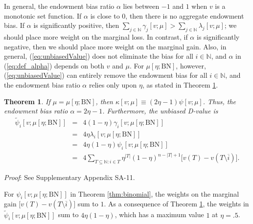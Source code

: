 \documentclass[a4paper,12pt]{article}
\newtheorem{theorem}{Theorem}
\begin{document}
In general, the endowment bias ratio $\alpha$ lies between $-1$ and $1$ when $v$ is a monotonic set function. 
If $\alpha$ is close to $0$, then there is no aggregate endowment bias. If $\alpha$ is significantly positive, 
then $\sum\limits_{j\in \mathbb{N}} \gamma_j [v;\mu] > \sum\limits_{j\in \mathbb{N}} \lambda_j [v;\mu]$; we should place more weight on the marginal loss. 
In contrast, if $\alpha$ is significantly negative, then we should place more weight on the marginal gain.
Also, in general, (\ref{eq:unbiasedValue}) does not eliminate the bias for all $i\in \mathbb{N}$, and $\alpha$ in (\ref{eq:def_alpha}) depends on both $v$ and $\mu$. 
For $\mu[\eta; \mathrm{BN}]$, however, (\ref{eq:unbiasedValue}) can entirely remove the endowment bias 
for all $i\in \mathbb{N}$, and the endowment bias ratio $\alpha$ relies only upon $\eta$, as stated in Theorem \ref{thm:binomialbias}.

\begin{theorem}\label{thm:binomialbias}
If $\mu = \mu[\eta; \mathrm{BN}]$, then $\kappa[v;\mu] \equiv (2\eta-1) \psi[v; \mu]$. 
Thus, the endowment bias ratio $\alpha = 2\eta-1$. 
Furthermore, the unbiased D-value is
$$
\begin{array}{rcl}
\tilde \psi_i[v; \mu[\eta; \mathrm{BN}]] 
&=& 4(1-\eta)\gamma_i[v; \mu[\eta; \mathrm{BN}] ] \\
&=& 4\eta\lambda_i[v; \mu[\eta; \mathrm{BN}] ]  \\
&=& 4\eta (1-\eta)\psi_i[v; \mu[\eta; \mathrm{BN}]] \\
&=& 4 \sum\limits_{T\subseteq \mathbb{N}: i\in T} \eta^{|T|} (1-\eta)^{n-|T|+1} \big[ v(T)-v(T\setminus \overline{i}) \big].
\end{array}
$$
\end{theorem}

\noindent \textit{Proof}: See Supplementary Appendix SA-11.

For $\psi_i[v; \mu [\eta; \mathrm{BN}]]$ in Theorem \ref{thm:binomial}, the weights on the marginal gain $\big[ v(T)-v(T\setminus \overline{i}) \big]$ sum to $1$.
As a consequence of Theorem \ref{thm:binomialbias}, the weights in $\tilde \psi_i[v; \mu [\eta; \mathrm{BN}]]$ sum to $4 \eta (1-\eta)$, which has a maximum value $1$ at $\eta=.5$.
\end{document}
